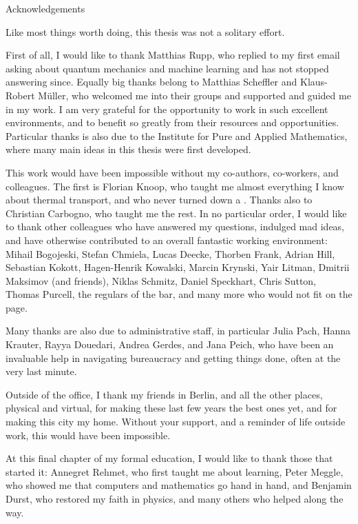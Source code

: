 \cleardoublepage

\thispagestyle{plain}

{\normalfont\Large\noindent Acknowledgements}
\vspace{\baselineskip}

\noindent
Like most things worth doing, this thesis was not a solitary effort.

First of all, I would like to thank Matthias Rupp, who replied to my first email asking about quantum mechanics and machine learning and has not stopped answering since.
Equally big thanks belong to Matthias Scheffler and Klaus-Robert Müller, who welcomed me into their groups and supported and guided me in my work. I am very grateful for the opportunity to work in such excellent environments, and to benefit so greatly from their resources and opportunities. Particular thanks is also due to the Institute for Pure and Applied Mathematics, where many main ideas in this thesis were first developed.

This work would have been impossible without my co-authors, co-workers, and colleagues. The first is Florian Knoop, who taught me almost everything I know about thermal transport, and who never turned down a . Thanks also to Christian Carbogno, who taught me the rest. In no particular order, I would like to thank other colleagues who have answered my questions, indulged mad ideas, and have otherwise contributed to an overall fantastic working environment: 
Mihail Bogojeski,
Stefan Chmiela,
Lucas Deecke,
Thorben Frank,
Adrian Hill,
Sebastian Kokott,
Hagen-Henrik Kowalski,
Marcin Krynski,
Yair Litman,
Dmitrii Maksimov (and friends),
Niklas Schmitz,
Daniel Speckhart,
Chris Sutton,
Thomas Purcell,
the regulars of the \ase bar,
and many more who would not fit on the page.

Many thanks are also due to administrative staff, in particular Julia Pach, Hanna Krauter, Rayya Douedari, Andrea Gerdes, and Jana Peich, who have been an invaluable help in navigating bureaucracy and getting things done, often at the very last minute.

Outside of the office, I thank my friends in Berlin, and all the other places, physical and virtual, for making these last few years the best ones yet, and for making this city my home. Without your support, and a reminder of life outside work, this would have been impossible.

At this final chapter of my formal education, I would like to thank those that started it: Annegret Rehmet, who first taught me about learning, Peter Meggle, who showed me that computers and mathematics go hand in hand, and Benjamin Durst, who restored my faith in physics, and many others who helped along the way.


